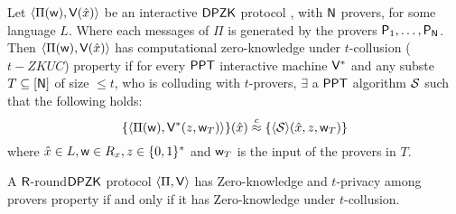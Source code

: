 \begin{definition}
	Let $\langle  \Pi ( \mathsf{w} ), \mathsf{V}( \hat{x} )\rangle$ be an interactive $\mathsf{DPZK}$ protocol , with $\mathsf{N}$ provers, for some language $L$. Where each messages of $\Pi$ is generated by the provers $\mathsf{P}_1, \ldots, \mathsf{P}_{\mathsf{N}}$. Then $\langle  \Pi ( \mathsf{w} ), \mathsf{V}( \hat{x} )\rangle$ has computational zero-knowledge under $t$-collusion ($t-ZKUC$) property if for every $\mathsf{PPT}$ interactive machine $\mathsf{V}^*$ and any subste $T\subseteq [\mathsf{N}]$ of size $\leq t$, who is colluding with $t$-provers, $\exists$ a $\mathsf{PPT}$ algorithm $\mathcal{S}$ such that the following holds: 
	$$ \{ \langle \Pi(\mathsf{w}),\mathsf{V}^*(z, \mathsf{w}_T)\rangle \}( \hat{x})  \stackrel{c}{\approx} \{ \langle \mathcal{S} \rangle (\hat{x}, z, \mathsf{w}_T) \} $$
	where $\hat{x} \in L, \mathsf{w} \in R_x, z\in \{0,1\}^*$ and $\mathsf{w}_T$ is the input of the provers in $T$. 
\end{definition}

\begin{theorem}\label{theo:equivalent}
	A $\mathsf{R}$-round$\mathsf{DPZK}$ protocol $\langle \Pi,\mathsf{V}\rangle$ has Zero-knowledge and $t$-privacy among provers property if and only if it has Zero-knowledge under $t$-collusion.
\end{theorem}

